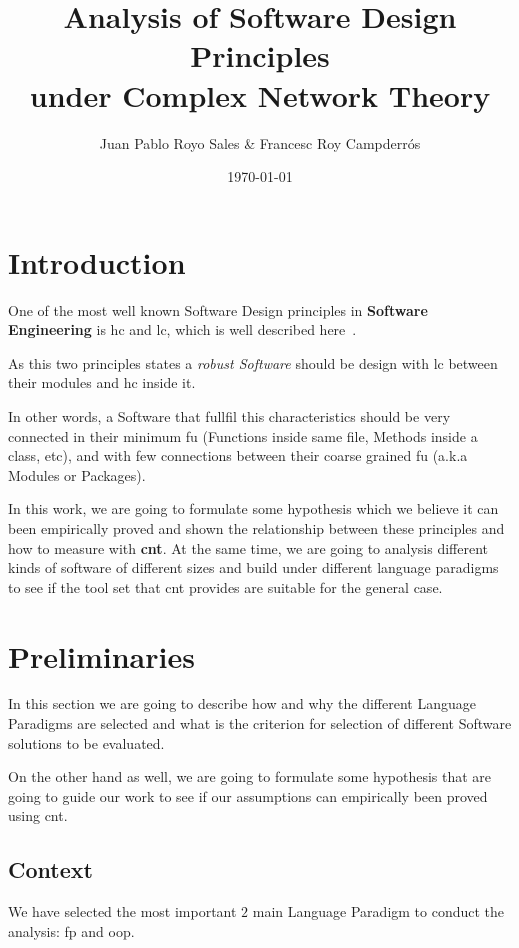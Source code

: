 \documentclass[12pt, a4paper]{article}
\title{%
      Analysis of Software Design Principles \\
      under Complex Network Theory\\
}
\author{Juan Pablo Royo Sales \& Francesc Roy Campderrós}
\affil{Universitat Politècnica de Catalunya}
\date\today
\begin{document}
\maketitle

\tableofcontents

\section{Introduction}
One of the most well known Software Design principles in \textbf{Software Engineering} is \acrfull{hc} and \acrfull{lc}, which is well described here~\cite{cohesion_coupling}.

As this two principles states a \textit{robust Software} should be design with \acrlong{lc} between their modules and \acrlong{hc} inside it. 

In other words, a Software that fullfil this characteristics should be very connected in their minimum \acrfull{fu} (Functions inside same file, Methods inside a class, etc), and with few connections between their coarse grained \acrshort{fu} (a.k.a Modules or Packages).

In this work, we are going to formulate some hypothesis which we believe it can been empirically proved and shown the relationship between these principles and how to measure with \textbf{\acrfull{cnt}}.
At the same time, we are going to analysis different kinds of software of different sizes and build under different language paradigms to see if the tool set that \acrshort{cnt} provides are suitable for the general case. 

\section{Preliminaries}
In this section we are going to describe how and why the different Language Paradigms are selected and what is the criterion for selection of different Software solutions to be evaluated.

On the other hand as well, we are going to formulate some hypothesis that are going to guide our work to see if our assumptions can empirically been proved using \acrlong{cnt}.

\subsection{Context}
We have selected the most important $2$ main Language Paradigm to conduct the analysis: \acrfull{fp} and \acrfull{oop}. 
\end{document}
